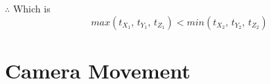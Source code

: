 $\therefore$ Which is
\begin{equation}\label{equ:ray-box-3d-intersection}
max(t_{X_1},\,t_{Y_1},\,t_{Z_1}) < min(t_{X_2},\,t_{Y_2},\,t_{Z_2})
\end{equation}

\section{Camera Movement}




